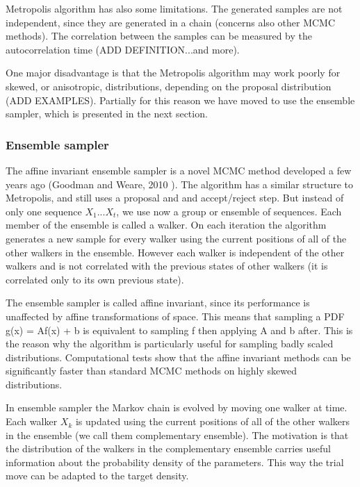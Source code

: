\documentclass{wihuri}
\begin{document}
Metropolis algorithm has also some limitations. The generated samples are not independent, since they are generated in a chain (concerns also other MCMC methods). The correlation between the samples can be measured by the autocorrelation time (ADD DEFINITION...and more). 


One major disadvantage is that the Metropolis algorithm may work poorly for skewed, or anisotropic, distributions, depending on the proposal distribution (ADD EXAMPLES). Partially for this reason we have moved to use the ensemble sampler, which is presented in the next section. 



\subsubsection{Ensemble sampler}

The affine invariant ensemble sampler is a novel MCMC method developed a few years ago (Goodman and Weare, 2010 \cite{ensemble1}). The algorithm has a similar structure to Metropolis, and still uses a proposal and and accept/reject step. But instead of only one sequence $X_{1}...X_{t}$, we use now a group or ensemble of sequences. Each member of the ensemble is called a walker. On each iteration the algorithm generates a new sample for every walker using the  current positions of all of the other walkers in
the ensemble. However each walker is independent of the other walkers and is not correlated with the previous states of other walkers (it is correlated only to its own previous state).




The ensemble sampler is called affine invariant, since its performance is unaffected by affine transformations of space. This means that sampling a PDF g(x) = Af(x) + b is equivalent to sampling
f then applying A and b after. This is the reason why the algorithm is particularly useful for sampling badly scaled distributions. Computational tests show that the affine invariant methods can be significantly faster than standard MCMC methods on highly skewed distributions.

In ensemble sampler the  Markov chain is evolved by moving one walker at time. Each walker $X_{k}$ is updated using the current positions of all of the other walkers in
the ensemble (we call them complementary ensemble). The motivation is that the distribution of the walkers in the complementary ensemble carries useful information about the probability density of the parameters. This way the trial move can be adapted to the target density.  
\end{document}
